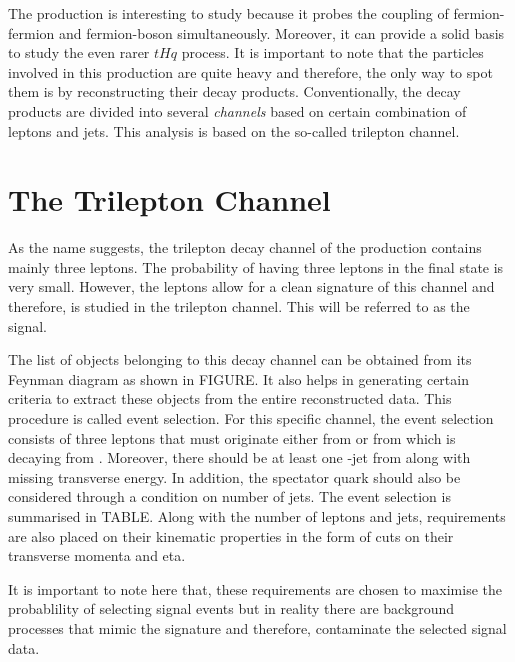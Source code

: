 
The \tZq production is interesting to study because it probes the coupling
of fermion-fermion and fermion-boson simultaneously. Moreover, it can provide
a solid basis to study the even rarer $tHq$ process. It is important to note 
that the particles involved in this production are quite heavy and therefore,
the only way to spot them is by reconstructing their decay products. 
Conventionally, the decay products are divided into several \textit{channels}
based on certain combination of leptons and jets. This analysis is based on
the so-called trilepton channel.

\section{The \tZqsec Trilepton Channel}
As the name suggests, the trilepton decay channel of the \tZq production 
contains mainly three leptons. The probability of having three leptons in 
the final state is very small. However, the leptons allow for a clean signature
of this channel and therefore, \tZq is studied in the trilepton channel. This
will be referred to as the signal.

The list of objects belonging to this decay channel can be obtained from its
Feynman diagram as shown in FIGURE. It also helps in generating certain
criteria to extract these objects from the entire reconstructed data.
This procedure is called event selection. For this specific channel, the
event selection consists of three leptons that must originate either 
from \PZ or from \PW which is decaying from \Ptop. Moreover, 
there should be at least one \Pbottom-jet from \Ptop along with
missing transverse energy. In addition, the spectator quark should 
also be considered through a condition on number of jets. 
The event selection is summarised in TABLE. Along with the number of leptons
and jets, requirements are also placed on their kinematic properties in the
form of cuts on their transverse momenta and eta. 

It is important to note here that, these requirements are chosen to 
maximise the probablility of selecting signal events
but in reality there are background processes that mimic the \tZq signature
and therefore, contaminate the selected signal data. 


